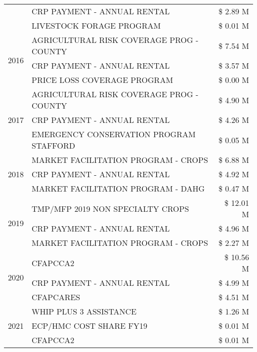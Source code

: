 \begin{tabular}{llr}
 & CRP PAYMENT - ANNUAL RENTAL & \$ 2.89 M \\
 & LIVESTOCK FORAGE PROGRAM & \$ 0.01 M \\
\cline{1-3}
\multirow[t]{3}{*}{2016} & AGRICULTURAL RISK COVERAGE PROG - COUNTY & \$ 7.54 M \\
 & CRP PAYMENT - ANNUAL RENTAL & \$ 3.57 M \\
 & PRICE LOSS COVERAGE PROGRAM & \$ 0.00 M \\
\cline{1-3}
\multirow[t]{3}{*}{2017} & AGRICULTURAL RISK COVERAGE PROG - COUNTY & \$ 4.90 M \\
 & CRP PAYMENT - ANNUAL RENTAL & \$ 4.26 M \\
 & EMERGENCY CONSERVATION PROGRAM STAFFORD & \$ 0.05 M \\
\cline{1-3}
\multirow[t]{3}{*}{2018} & MARKET FACILITATION PROGRAM - CROPS & \$ 6.88 M \\
 & CRP PAYMENT - ANNUAL RENTAL & \$ 4.92 M \\
 & MARKET FACILITATION PROGRAM - DAHG & \$ 0.47 M \\
\cline{1-3}
\multirow[t]{3}{*}{2019} & TMP/MFP 2019 NON SPECIALTY CROPS & \$ 12.01 M \\
 & CRP PAYMENT - ANNUAL RENTAL & \$ 4.96 M \\
 & MARKET FACILITATION PROGRAM - CROPS & \$ 2.27 M \\
\cline{1-3}
\multirow[t]{3}{*}{2020} & CFAPCCA2 & \$ 10.56 M \\
 & CRP PAYMENT - ANNUAL RENTAL & \$ 4.99 M \\
 & CFAPCARES & \$ 4.51 M \\
\cline{1-3}
\multirow[t]{3}{*}{2021} & WHIP PLUS 3 ASSISTANCE & \$ 1.26 M \\
 & ECP/HMC COST SHARE FY19 & \$ 0.01 M \\
 & CFAPCCA2 & \$ 0.01 M \\
\cline{1-3}
\bottomrule
\end{tabular}
